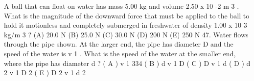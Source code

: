 A ball that can float on water has mass 5.00 kg and volume 2.50 x 10 -2 m 3 . What is the magnitude of the
downward force that must be applied to the ball to hold it motionless and completely submerged in freshwater
of density 1.00 x 10 3 kg/m 3 ?
(A) 20.0 N
(B) 25.0 N
(C) 30.0 N
(D) 200 N
(E) 250 N
47. Water flows through the pipe shown. At the larger end, the pipe has diameter D and the speed of the water is v 1 .
What is the speed of the water at the smaller end, where the pipe has diameter d ?
( A ) v 1
334
( B )
d
v 1
D
( C )
D
v 1
d
( D )
d 2
v 1
D 2
( E )
D 2
v 1
d 2





\endinput


